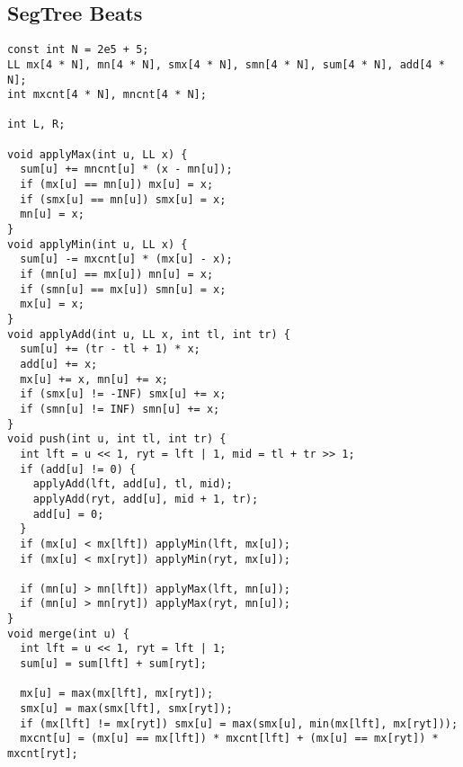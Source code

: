 \documentclass[FSZ,a4paper,onesided]{article}
\begin{document}
\begin{multicols*}{\COLS}
\subsection{SegTree Beats}
\begin{lstlisting}
const int N = 2e5 + 5;
LL mx[4 * N], mn[4 * N], smx[4 * N], smn[4 * N], sum[4 * N], add[4 * N];
int mxcnt[4 * N], mncnt[4 * N];

int L, R;

void applyMax(int u, LL x) {
  sum[u] += mncnt[u] * (x - mn[u]);
  if (mx[u] == mn[u]) mx[u] = x;
  if (smx[u] == mn[u]) smx[u] = x;
  mn[u] = x;
}
void applyMin(int u, LL x) {
  sum[u] -= mxcnt[u] * (mx[u] - x);
  if (mn[u] == mx[u]) mn[u] = x;
  if (smn[u] == mx[u]) smn[u] = x;
  mx[u] = x;
}
void applyAdd(int u, LL x, int tl, int tr) {
  sum[u] += (tr - tl + 1) * x;
  add[u] += x;
  mx[u] += x, mn[u] += x;
  if (smx[u] != -INF) smx[u] += x;
  if (smn[u] != INF) smn[u] += x;
}
void push(int u, int tl, int tr) {
  int lft = u << 1, ryt = lft | 1, mid = tl + tr >> 1;
  if (add[u] != 0) {
    applyAdd(lft, add[u], tl, mid);
    applyAdd(ryt, add[u], mid + 1, tr);
    add[u] = 0;
  }
  if (mx[u] < mx[lft]) applyMin(lft, mx[u]);
  if (mx[u] < mx[ryt]) applyMin(ryt, mx[u]);

  if (mn[u] > mn[lft]) applyMax(lft, mn[u]);
  if (mn[u] > mn[ryt]) applyMax(ryt, mn[u]);
}
void merge(int u) {
  int lft = u << 1, ryt = lft | 1;
  sum[u] = sum[lft] + sum[ryt];

  mx[u] = max(mx[lft], mx[ryt]);
  smx[u] = max(smx[lft], smx[ryt]);
  if (mx[lft] != mx[ryt]) smx[u] = max(smx[u], min(mx[lft], mx[ryt]));
  mxcnt[u] = (mx[u] == mx[lft]) * mxcnt[lft] + (mx[u] == mx[ryt]) * mxcnt[ryt];


\end{lstlisting}
\end{multicols*}
\end{document}
